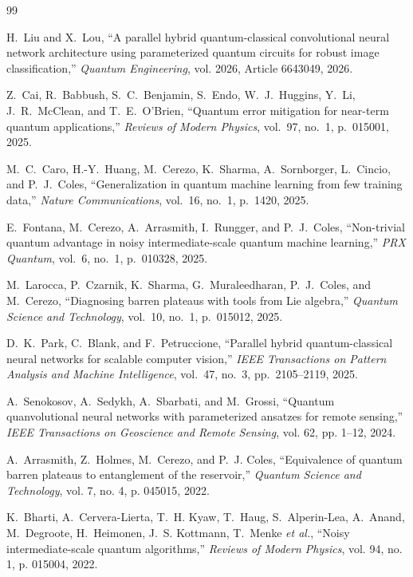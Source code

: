 \documentclass[journal]{IEEEtran}
\begin{document}
\begin{thebibliography}{99}

H.~Liu and X.~Lou,
``A parallel hybrid quantum-classical convolutional neural network architecture using parameterized quantum circuits for robust image classification,'' \emph{Quantum Engineering}, vol. 2026, Article 6643049, 2026.

Z.~Cai, R.~Babbush, S.~C.~Benjamin, S.~Endo, W.~J.~Huggins, Y.~Li, J.~R.~McClean, and T.~E.~O'Brien,
``Quantum error mitigation for near-term quantum applications,'' \emph{Reviews of Modern Physics}, vol.~97, no.~1, p.~015001, 2025.

M.~C.~Caro, H.-Y.~Huang, M.~Cerezo, K.~Sharma, A.~Sornborger, L.~Cincio, and P.~J.~Coles,
``Generalization in quantum machine learning from few training data,'' \emph{Nature Communications}, vol.~16, no.~1, p.~1420, 2025.

E.~Fontana, M.~Cerezo, A.~Arrasmith, I.~Rungger, and P.~J.~Coles,
``Non-trivial quantum advantage in noisy intermediate-scale quantum machine learning,'' \emph{PRX Quantum}, vol.~6, no.~1, p.~010328, 2025.

M.~Larocca, P.~Czarnik, K.~Sharma, G.~Muraleedharan, P.~J.~Coles, and M.~Cerezo,
``Diagnosing barren plateaus with tools from Lie algebra,'' \emph{Quantum Science and Technology}, vol.~10, no.~1, p.~015012, 2025.

D.~K.~Park, C.~Blank, and F.~Petruccione,
``Parallel hybrid quantum-classical neural networks for scalable computer vision,'' \emph{IEEE Transactions on Pattern Analysis and Machine Intelligence}, vol.~47, no.~3, pp.~2105--2119, 2025.

A.~Senokosov, A.~Sedykh, A.~Sbarbati, and M.~Grossi,
``Quantum quanvolutional neural networks with parameterized ansatzes for remote sensing,'' \emph{IEEE Transactions on Geoscience and Remote Sensing}, vol. 62, pp. 1--12, 2024.

A.~Arrasmith, Z.~Holmes, M.~Cerezo, and P.~J. Coles,
``Equivalence of quantum barren plateaus to entanglement of the reservoir,'' \emph{Quantum Science and Technology}, vol. 7, no. 4, p. 045015, 2022.

K.~Bharti, A.~Cervera-Lierta, T.~H. Kyaw, T.~Haug, S.~Alperin-Lea, A.~Anand, M.~Degroote, H.~Heimonen, J.~S. Kottmann, T.~Menke \emph{et al.},
``Noisy intermediate-scale quantum algorithms,'' \emph{Reviews of Modern Physics}, vol. 94, no. 1, p. 015004, 2022.


\end{thebibliography}
\end{document}
